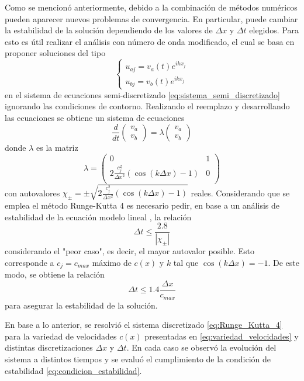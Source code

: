 \documentclass[aps,prb,twocolumn,superscriptaddress,floatfix,longbibliography,10pt]{revtex4-2}
\newcounter{para}
\begin{document}
Como se mencionó anteriormente, debido a la combinación de métodos numéricos pueden aparecer nuevos problemas de convergencia. En particular, puede cambiar la estabilidad de la solución dependiendo de los valores de $\Delta x$ y $\Delta t$ elegidos. Para esto es útil realizar el análisis con número de onda modificado, el cual se basa en proponer soluciones del tipo
\[\left\{\begin{matrix}
  u_{a j} = v_a(t)e^{i k x_j}\\
  u_{b j} = v_b(t)e^{i k x_j} 
\end{matrix}\right.\]
en el sistema de ecuaciones semi-discretizado \ref{eq:sistema_semi_discretizado} ignorando las condiciones de contorno. Realizando el reemplazo y desarrollando las ecuaciones se obtiene un sistema de ecuaciones
\[
\frac{d}{dt} \begin{pmatrix}
 v_a \\ v_b
 \end{pmatrix}
 =  
 \lambda
 \begin{pmatrix}
 v_a \\ v_b
 \end{pmatrix}
\]
donde $\lambda$ es la matriz
\[\lambda = \begin{pmatrix}
  0 & 1 \\
  2 \frac{c_j^2}{\Delta x^2}(\cos{(k \Delta x)} - 1) & 0 \\
  \end{pmatrix}\]
con autovalores $\chi_{\pm} = \pm \sqrt{2 \frac{c_j^2}{\Delta x^2}(\cos{(k \Delta x)} - 1)}$ reales. Considerando que se emplea el método Runge-Kutta 4 es necesario pedir, en base a un análisis de estabilidad de la ecuación modelo lineal \cite{Moin}, la relación
\[\Delta t \leq \frac{2.8}{ |\chi_{\pm}| }\]
considerando el "peor caso", es decir, el mayor autovalor posible. Esto corresponde a $c_j = c_{max}$ máximo de $c(x)$ y $k$ tal que $\cos{(k \Delta x)} = -1$. De este modo, se obtiene la relación
\begin{equation}
  \Delta t \leq 1.4 \frac{\Delta x}{c_{max}}
  \label{eq:condicion_estabilidad}
\end{equation}
para asegurar la estabilidad de la solución.


En base a lo anterior, se resolvió el sistema discretizado \ref{eq:Runge_Kutta_4} para la variedad de velocidades $c(x)$ presentadas en \ref{eq:variedad_velocidades} y distintas discretizaciones $\Delta x$ y $\Delta t$. En cada caso se observó la evolución del sistema a distintos tiempos y se evaluó el cumplimiento de la condición de estabilidad \ref{eq:condicion_estabilidad}.
\end{document}
